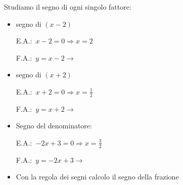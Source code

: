 \begin{esempio}
Studiamo il segno di ogni singolo fattore:
\begin{itemize}
 \item segno di $(x-2)$\\
 \begin{minipage}{.45\textwidth}
  E.A.:~$x-2=0 \Rightarrow x=2$
 \end{minipage}
 \begin{minipage}{.25\textwidth}
  F.A.:~$y=x-2 \rightarrow $
 \end{minipage}
 \begin{minipage}{.3\textwidth}
  \begin{inaccessibleblock}
  
\end{inaccessibleblock}
 \end{minipage}
 \item segno di $(x+2)$\\
 \begin{minipage}{.45\textwidth}
  E.A.:~$x+2=0 \Rightarrow x=\frac{1}{2}$
 \end{minipage}
 \begin{minipage}{.25\textwidth}
  F.A.:~$y=x+2 \rightarrow $
 \end{minipage}
 \begin{minipage}{.3\textwidth}
  \begin{inaccessibleblock}
  
\end{inaccessibleblock}
 \end{minipage}
 \item Segno del denominatore:\\
 \begin{minipage}{.45\textwidth}
  E.A.:~$-2x+3=0 \Rightarrow x=\frac{3}{2}$
 \end{minipage}
 \begin{minipage}{.25\textwidth}
  F.A.:~$y=-2x+3 \rightarrow $
 \end{minipage}
 \begin{minipage}{.3\textwidth}
  \begin{inaccessibleblock}
  
\end{inaccessibleblock}
 \end{minipage}
 \item Con la regola dei segni calcolo il segno della frazione 
\begin{inaccessibleblock}
   

\end{inaccessibleblock}
\end{itemize}
\end{esempio}
